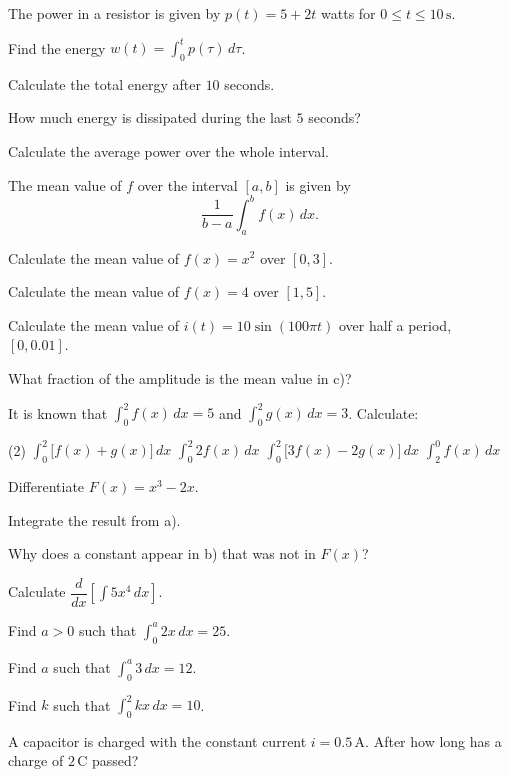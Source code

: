 The power in a resistor is given by $p(t) = 5 + 2t$ watts for $0 \leq t \leq 10\,\text{s}$.
\begin{parts}
  \item Find the energy $w(t) = \displaystyle\int_0^t p(\tau)\,d\tau$.
  \item Calculate the total energy after $10$ seconds.
  \item How much energy is dissipated during the last $5$ seconds?
  \item Calculate the average power over the whole interval.
\end{parts}

The mean value of $f$ over the interval $[a, b]$ is given by
\[
  \frac{1}{b - a}\int_a^b f(x)\,dx.
\]
\begin{parts}
  \item Calculate the mean value of $f(x) = x^2$ over $[0, 3]$.
  \item Calculate the mean value of $f(x) = 4$ over $[1, 5]$.
  \item Calculate the mean value of $i(t) = 10\sin(100\pi t)$ over half a period,
    $[0, 0.01]$.
  \item What fraction of the amplitude is the mean value in c)?
\end{parts}

It is known that $\displaystyle\int_0^2 f(x)\,dx = 5$ and $\displaystyle\int_0^2 g(x)\,dx = 3$.
Calculate:
\begin{delar}(2)
  \task $\displaystyle\int_0^2 \bigl[f(x) + g(x)\bigr]\,dx$
  \task $\displaystyle\int_0^2 2f(x)\,dx$
  \task $\displaystyle\int_0^2 \bigl[3f(x) - 2g(x)\bigr]\,dx$
  \task $\displaystyle\int_2^0 f(x)\,dx$
\end{delar}

\begin{parts}
  \item Differentiate $F(x) = x^3 - 2x$.
  \item Integrate the result from a).
  \item Why does a constant appear in b) that was not in $F(x)$?
  \item Calculate $\dfrac{d}{dx}\left[\displaystyle\int 5x^4\,dx\right]$.
\end{parts}

\begin{parts}
  \item Find $a > 0$ such that $\displaystyle\int_0^a 2x\,dx = 25$.
  \item Find $a$ such that $\displaystyle\int_0^a 3\,dx = 12$.
  \item Find $k$ such that $\displaystyle\int_0^2 kx\,dx = 10$.
  \item A capacitor is charged with the constant current $i = 0.5\,\text{A}$. After how long has a
    charge of $2\,\text{C}$ passed?
\end{parts}

